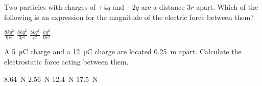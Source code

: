 \documentclass[]{exam}
\begin{document}
\begin{questions}



\question
Two particles with charges of $+4q$ and $-2q$ are a distance $3r$ apart. Which of the following is an expression for the magnitude of the electric force between them?
\smallskip

\begin{randomizeoneparchoices}
    \correctchoice $\displaystyle \frac{8kq^2}{9r^2}$
    \choice $\displaystyle \frac{8kq^2}{3r^2}$
    \choice $\displaystyle \frac{8kq^2}{r^2}$
    \choice $\displaystyle \frac{kq^2}{9r^2}$
\end{randomizeoneparchoices}

\question
A \SI{5}{\micro\coulomb} charge and a \SI{12}{\micro\coulomb} charge are located \SI{0.25}{m} apart. Calculate the electrostatic force acting between them.

\begin{randomizechoices}
    \correctchoice \SI{8.64}{N}
    \choice \SI{2.56}{N}
    \choice \SI{12.4}{N}
    \choice \SI{17.5}{N}
\end{randomizechoices}


\end{questions}
\end{document}
